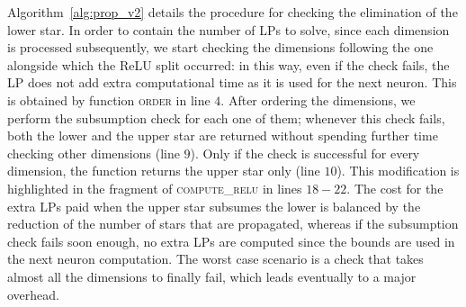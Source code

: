 Algorithm~\ref{alg:prop_v2} details the procedure for checking the elimination of
the lower star. In order to contain the number of LPs to solve, since each dimension
is processed subsequently, we start checking the dimensions following the one 
alongside which the ReLU split occurred: in this way, even if the check fails, the
LP does not add extra computational time as it is used for the next neuron. This
is obtained by function \textsc{order} in line $4$. 
After ordering the dimensions, we perform the subsumption check for each one of them;
whenever this check fails, both the lower and the upper star are returned without
spending further time checking other dimensions (line $9$). Only if the check is 
successful for every dimension, the function returns the upper star only (line $10$).
This modification is highlighted in the fragment of \textsc{compute\_relu} in lines
$18 - 22$. The cost for the extra LPs paid when the upper star subsumes the lower is 
balanced by the reduction of the number of stars that are propagated, whereas if the
subsumption check fails soon enough, no extra LPs are computed since the bounds are
used in the next neuron computation. The worst case scenario is a check that takes
almost all the dimensions to finally fail, which leads eventually to a major overhead.